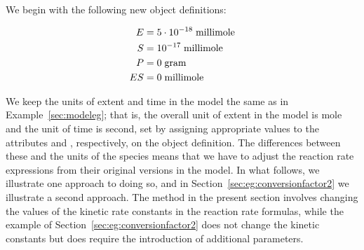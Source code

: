 We begin with the following new \Species object definitions:
\begin{linenomath}
  \begin{align*}
    E   & = 5 \cdot 10^{-18}\; \text{millimole} \\
    S   & = 10^{-17}\; \text{millimole} \\
    P   & = 0\; \text{gram} \\
    ES  & = 0\; \text{millimole}
  \end{align*}
\end{linenomath}
We keep the units of extent and time in the model the same as in
Example~\ref{sec:modeleg}; that is, the overall unit of extent in
the model is \unit{mole} and the unit of time is \unit{second},
set by assigning appropriate values to the attributes
 and , respectively, on the
\Model object definition.  The differences between these and the
units of the species means that we have to adjust the reaction
rate expressions from their original versions in the model.  In
what follows, we illustrate one approach to doing so, and in
Section~\ref{sec:eg:conversionfactor2} we illustrate a second
approach.  The method in the present section involves changing the
values of the kinetic rate constants in the reaction rate
formulas, while the example of
Section~\ref{sec:eg:conversionfactor2} does not change the kinetic
constants but does require the introduction of additional
parameters.

\newcommand{\veq}    {\ensuremath{v_\text{veq}}\xspace}
\newcommand{\vcat}   {\ensuremath{v_\text{vcat}}\xspace}
\newcommand{\Vcomp}  {\ensuremath{V_\text{comp}}\xspace}
\newcommand{\convE}  {\ensuremath{c_\species{E}}\xspace}
\newcommand{\convS}  {\ensuremath{c_\species{S}}\xspace}
\newcommand{\convP}  {\ensuremath{c_\species{P}}\xspace}
\newcommand{\convES} {\ensuremath{c_{\species{ES}}}\xspace}
\newcommand{\konnew} {\ensuremath{k_\text{on}^{*}}\xspace}
\newcommand{\koffnew}{\ensuremath{k_\text{off}^{*}}\xspace}
\newcommand{\kcatnew}{\ensuremath{k_\text{cat}^{*}}\xspace}

